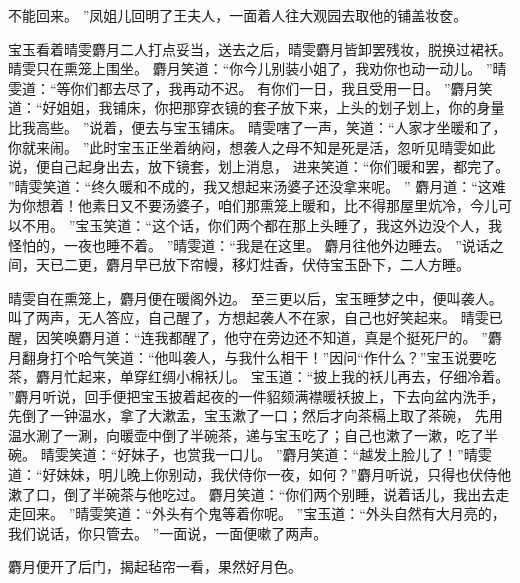 不能回来。
”凤姐儿回明了王夫人，一面着人往大观园去取他的铺盖妆奁。
\par
宝玉看着晴雯麝月二人打点妥当，送去之后，晴雯麝月皆卸罢残妆，脱换过裙袄。
晴雯只在熏笼上围坐。
麝月笑道：“你今儿别装小姐了，我劝你也动一动儿。
”晴雯道：“等你们都去尽了，我再动不迟。
有你们一日，我且受用一日。
”麝月笑道：“好姐姐，我铺床，你把那穿衣镜的套子放下来，上头的划子划上，你的身量比我高些。
”说着，便去与宝玉铺床。
晴雯嗐了一声，笑道：“人家才坐暖和了，你就来闹。
”此时宝玉正坐着纳闷，想袭人之母不知是死是活，忽听见晴雯如此说，便自己起身出去，放下镜套，划上消息，
进来笑道：“你们暖和罢，都完了。
”晴雯笑道：“终久暖和不成的，我又想起来汤婆子还没拿来呢。
”
麝月道：“这难为你想着！他素日又不要汤婆子，咱们那熏笼上暖和，比不得那屋里炕冷，今儿可以不用。
”宝玉笑道：“这个话，你们两个都在那上头睡了，我这外边没个人，我怪怕的，一夜也睡不着。
”晴雯道：“我是在这里。
麝月往他外边睡去。
”说话之间，天已二更，麝月早已放下帘幔，移灯炷香，伏侍宝玉卧下，二人方睡。
\par
晴雯自在熏笼上，麝月便在暖阁外边。
至三更以后，宝玉睡梦之中，便叫袭人。
叫了两声，无人答应，自己醒了，方想起袭人不在家，自己也好笑起来。
晴雯已醒，因笑唤麝月道：“连我都醒了，他守在旁边还不知道，真是个挺死尸的。
”麝月翻身打个哈气笑道：“他叫袭人，与我什么相干！”因问“作什么？”宝玉说要吃茶，麝月忙起来，单穿红绸小棉袄儿。
宝玉道：“披上我的袄儿再去，仔细冷着。
”麝月听说，回手便把宝玉披着起夜的一件貂颏满襟暖袄披上，下去向盆内洗手，先倒了一钟温水，拿了大漱盂，宝玉漱了一口；然后才向茶槅上取了茶碗，
先用温水涮了一涮，向暖壶中倒了半碗茶，递与宝玉吃了；自己也漱了一漱，吃了半碗。
晴雯笑道：“好妹子，也赏我一口儿。
”麝月笑道：“越发上脸儿了！”晴雯道：“好妹妹，明儿晚上你别动，我伏侍你一夜，如何？”麝月听说，只得也伏侍他漱了口，倒了半碗茶与他吃过。
麝月笑道：“你们两个别睡，说着话儿，我出去走走回来。
”晴雯笑道：“外头有个鬼等着你呢。
”宝玉道：“外头自然有大月亮的，我们说话，你只管去。
”一面说，一面便嗽了两声。
\par
麝月便开了后门，揭起毡帘一看，果然好月色。
